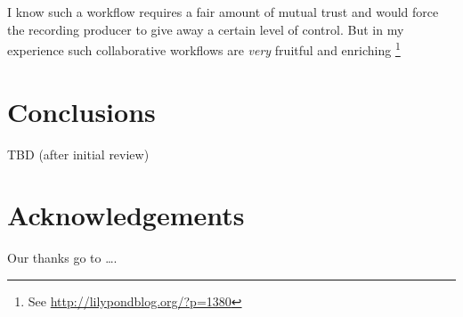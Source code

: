 \documentclass[11pt,a4paper]{article}
\begin{document}
I know such a workflow requires a fair amount of mutual trust and would force the
recording producer to give away a certain level of control.
But in my experience such collaborative workflows are \emph{very} fruitful and
enriching%
\footnote{See \url{http://lilypondblog.org/?p=1380}}


\section{Conclusions}

TBD (after initial review)


\section{Acknowledgements}

Our thanks go to \ldots .
\end{document}

